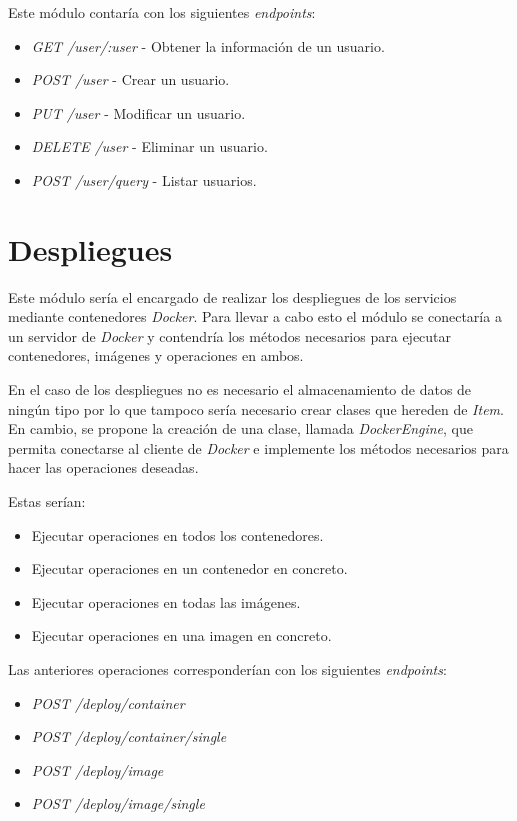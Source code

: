 \bigskip
Este módulo contaría con los siguientes \textit{endpoints}:
\begin{itemize}
	\item \textit{GET /user/:user} - Obtener la información de un usuario.
	\item \textit{POST /user} - Crear un usuario.
	\item \textit{PUT /user} - Modificar un usuario.
	\item \textit{DELETE /user} - Eliminar un usuario.
	\item \textit{POST /user/query} - Listar usuarios.
\end{itemize} 





\section{Despliegues}
\label{sec:deploycap6}

Este módulo sería el encargado de realizar los despliegues de los servicios mediante contenedores \textit{Docker}. Para llevar a cabo esto el módulo se conectaría a un servidor de \textit{Docker} y contendría los métodos necesarios para ejecutar contenedores, imágenes y operaciones en ambos.

En el caso de los despliegues no es necesario el almacenamiento de datos de ningún tipo por lo que tampoco sería necesario crear clases que hereden de \textit{Item}. En cambio, se propone la creación de una clase, llamada \textit{DockerEngine}, que permita conectarse al cliente de \textit{Docker} e implemente los métodos necesarios para hacer las operaciones deseadas.

Estas serían:
\begin{itemize}
	\item Ejecutar operaciones en todos los contenedores.
	\item Ejecutar operaciones en un contenedor en concreto.
	\item Ejecutar operaciones en todas las imágenes.
	\item Ejecutar operaciones en una imagen en concreto.
\end{itemize}


\bigskip
Las anteriores operaciones corresponderían con los siguientes \textit{endpoints}:
\begin{itemize}
	\item \textit{POST /deploy/container}
	\item \textit{POST /deploy/container/single}
	\item \textit{POST /deploy/image}
	\item \textit{POST /deploy/image/single}
\end{itemize}


